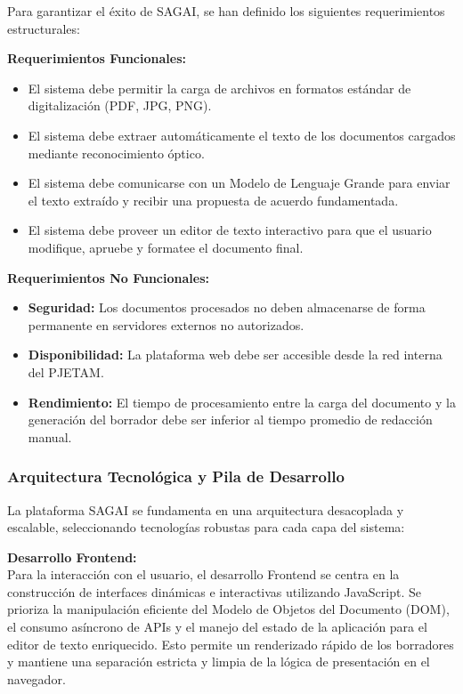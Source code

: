 Para garantizar el éxito de SAGAI, se han definido los siguientes requerimientos estructurales:

\textbf{Requerimientos Funcionales:}
\begin{itemize}
    \item El sistema debe permitir la carga de archivos en formatos estándar de digitalización (PDF, JPG, PNG).
    \item El sistema debe extraer automáticamente el texto de los documentos cargados mediante reconocimiento óptico.
    \item El sistema debe comunicarse con un Modelo de Lenguaje Grande para enviar el texto extraído y recibir una propuesta de acuerdo fundamentada.
    \item El sistema debe proveer un editor de texto interactivo para que el usuario modifique, apruebe y formatee el documento final.
\end{itemize}

\textbf{Requerimientos No Funcionales:}
\begin{itemize}
    \item \textbf{Seguridad:} Los documentos procesados no deben almacenarse de forma permanente en servidores externos no autorizados.
    \item \textbf{Disponibilidad:} La plataforma web debe ser accesible desde la red interna del PJETAM.
    \item \textbf{Rendimiento:} El tiempo de procesamiento entre la carga del documento y la generación del borrador debe ser inferior al tiempo promedio de redacción manual.
\end{itemize}

\subsubsection*{Arquitectura Tecnológica y Pila de Desarrollo}

La plataforma SAGAI se fundamenta en una arquitectura desacoplada y escalable, seleccionando tecnologías robustas para cada capa del sistema:

\textbf{Desarrollo Frontend:}\\
Para la interacción con el usuario, el desarrollo Frontend se centra en la construcción de interfaces dinámicas e interactivas utilizando JavaScript. Se prioriza la manipulación eficiente del Modelo de Objetos del Documento (DOM), el consumo asíncrono de APIs y el manejo del estado de la aplicación para el editor de texto enriquecido. Esto permite un renderizado rápido de los borradores y mantiene una separación estricta y limpia de la lógica de presentación en el navegador.

